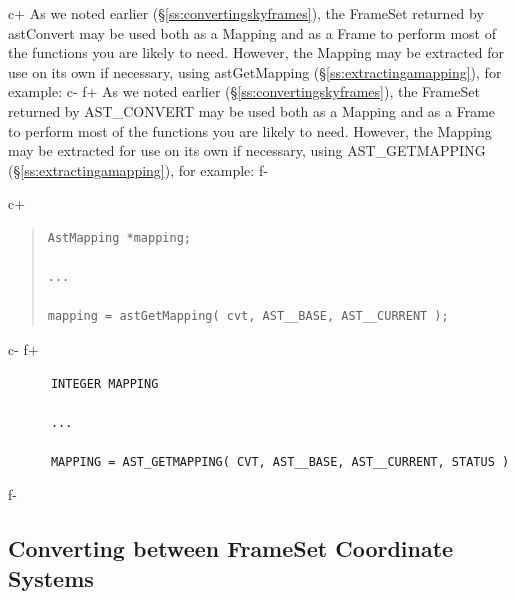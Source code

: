 \documentclass[twoside,11pt]{article}
\newcommand{\secref}[1]{\S\ref{#1}}
\newcommand{\secref}[1]{\ref{#1}}
\begin{document}
c+
As we noted earlier (\secref{ss:convertingskyframes}), the FrameSet
returned by astConvert may be used both as a Mapping and as a Frame to
perform most of the functions you are likely to need. However, the
Mapping may be extracted for use on its own if necessary, using
astGetMapping (\secref{ss:extractingamapping}), for example:
c-
f+
As we noted earlier (\secref{ss:convertingskyframes}), the FrameSet
returned by AST\_CONVERT may be used both as a Mapping and as a Frame
to perform most of the functions you are likely to need. However, the
Mapping may be extracted for use on its own if necessary, using
AST\_GETMAPPING (\secref{ss:extractingamapping}), for example:
f-

c+
\begin{quote}
\small
\begin{verbatim}
AstMapping *mapping;

...

mapping = astGetMapping( cvt, AST__BASE, AST__CURRENT );
\end{verbatim}
\normalsize
\end{quote}
c-
f+
\small
\begin{verbatim}
      INTEGER MAPPING

      ...

      MAPPING = AST_GETMAPPING( CVT, AST__BASE, AST__CURRENT, STATUS )
\end{verbatim}
\normalsize
f-

\subsection{\label{ss:framesetconverting}Converting between FrameSet Coordinate Systems}
\end{document}

